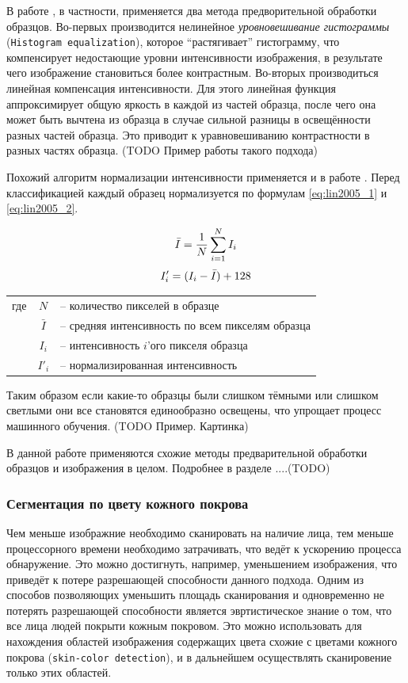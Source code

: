\documentclass[12pt]{report}
\begin{document}
В работе \citep{rowley1998neural}, в частности, применяется два метода предворительной обработки образцов. Во-первых производится нелинейное \emph{уровновешивание гистограммы} (\texttt{Histogram equalization}), которое ``растягивает'' гистограмму, что компенсирует недостающие уровни интенсивности изображения, в результате чего изображение становиться более контрастным. Во-вторых производиться линейная компенсация интенсивности. Для этого линейная функция аппроксимирует общую яркость в каждой из частей образца, после чего она может быть вычтена из образца в случае сильной разницы в освещённости разных частей образца. Это приводит к уравновешиванию контрастности в разных частях образца. (TODO Пример работы такого подхода) 

Похожий алгоритм нормализации интенсивности применяется и в работе \citep{lin2005face}. Перед классификацией каждый образец нормализуется по формулам \ref{eq:lin2005_1} и \ref{eq:lin2005_2}.

\begin{equation}
\label{eq:lin2005_1}
\centering
\bar{I}=\frac{1}{N}\sum_{i=1}^{N}I_{i}
\end{equation}
\begin{equation}
\label{eq:lin2005_2}
\centering
{I}'_i=(I_i-\bar{I})+128
\end{equation}

\begin{tabular}{p{3cm} c l}
где & $N$ & -- количество пикселей в образце\\
	& $\bar{I}$ & -- средняя интенсивность по всем пикселям образца\\
	& $I_i$ & -- интенсивность $i$'ого пикселя образца\\
	& ${I}'_i$ & -- нормализированная интенсивность\\
\end{tabular}

Таким образом если какие-то образцы были слишком тёмными или слишком светлыми они все становятся единообразно освещены, что упрощает процесс машинного обучения. (TODO Пример. Картинка)

В данной работе применяются схожие методы предварительной обработки образцов и изображения в целом. Подробнее в разделе ....(TODO)

\subsubsection{Сегментация по цвету кожного покрова}
\label{sec:skin_segm}
Чем меньше изображние необходимо сканировать на наличие лица, тем меньше процессорного времени необходимо затрачивать, что ведёт к ускорению процесса обнаружение. Это можно достигнуть, например, уменьшением изображения, что приведёт к потере разрешающей способности данного подхода. Одним из способов позволяющих уменьшить площадь сканирования и одновременно не потерять разрешающей способности является эвртистическое знание о том, что все лица людей покрыти кожным покровом. Это можно использовать для нахождения областей изображения содержащих цвета схожие с цветами кожного покрова (\texttt{skin-color detection}), и в дальнейшем осуществлять сканировение только этих областей.
\end{document}
